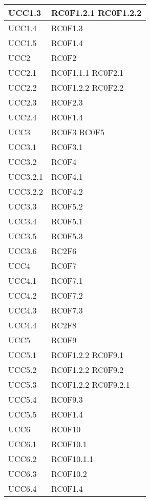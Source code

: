 \begin{center}
\begin{longtable}{|p{5cm}|p{5cm}|}
UCC1.3		& RC0F1.2.1 \newline RC0F1.2.2 \\\hline
UCC1.4		& RC0F1.3 \\\hline
UCC1.5		& RC0F1.4 \\\hline
UCC2		& RC0F2 \\\hline
UCC2.1		& RC0F1.1.1 \newline RC0F2.1 \\\hline
UCC2.2		& RC0F1.2.2 \newline RC0F2.2 \\\hline
UCC2.3		& RC0F2.3 \\\hline
UCC2.4		& RC0F1.4 \\\hline
UCC3		& RC0F3 \newline RC0F5 \\\hline
UCC3.1		& RC0F3.1 \\\hline
UCC3.2		& RC0F4 \\\hline
UCC3.2.1	& RC0F4.1 \\\hline
UCC3.2.2	& RC0F4.2 \\\hline
UCC3.3		& RC0F5.2 \\\hline
UCC3.4		& RC0F5.1 \\\hline
UCC3.5		& RC0F5.3 \\\hline
UCC3.6		& RC2F6 \\\hline
UCC4		& RC0F7 \\\hline
UCC4.1		& RC0F7.1 \\\hline
UCC4.2		& RC0F7.2 \\\hline
UCC4.3		& RC0F7.3 \\\hline
UCC4.4		& RC2F8 \\\hline
UCC5		& RC0F9 \\\hline
UCC5.1		& RC0F1.2.2 \newline RC0F9.1 \\\hline
UCC5.2		& RC0F1.2.2 \newline RC0F9.2 \\\hline
UCC5.3		& RC0F1.2.2 \newline RC0F9.2.1 \\\hline
UCC5.4		& RC0F9.3 \\\hline
UCC5.5		& RC0F1.4 \\\hline
UCC6		& RC0F10 \\\hline
UCC6.1		& RC0F10.1 \\\hline
UCC6.2		& RC0F10.1.1 \\\hline
UCC6.3		& RC0F10.2 \\\hline
UCC6.4		& RC0F1.4 \\\hline

\end{longtable}
\end{center}
